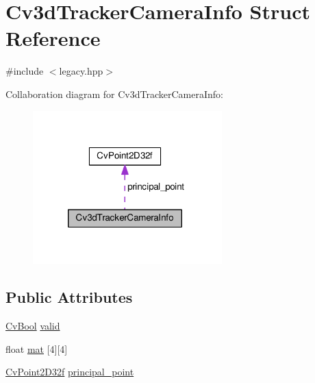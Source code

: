 \hypertarget{structCv3dTrackerCameraInfo}{\section{Cv3d\-Tracker\-Camera\-Info Struct Reference}
\label{structCv3dTrackerCameraInfo}
}


{\ttfamily \#include $<$legacy.\-hpp$>$}



Collaboration diagram for Cv3d\-Tracker\-Camera\-Info\-:\nopagebreak
\begin{figure}[H]
\begin{center}
\leavevmode
\includegraphics[width=207pt]{structCv3dTrackerCameraInfo__coll__graph}
\end{center}
\end{figure}
\subsection*{Public Attributes}
\begin{DoxyCompactItemize}
\item 
\hyperlink{legacy_8hpp_a05234b9731fdb4f89630aad4c254c105}{Cv\-Bool} \hyperlink{structCv3dTrackerCameraInfo_adc4a63ad78f2d9eda45418c1a37cc3f2}{valid}
\item 
float \hyperlink{structCv3dTrackerCameraInfo_a73da8b3a6d20e7857eeb4eb68bce974c}{mat} \mbox{[}4\mbox{]}\mbox{[}4\mbox{]}
\item 
\hyperlink{structCvPoint2D32f}{Cv\-Point2\-D32f} \hyperlink{structCv3dTrackerCameraInfo_a95df78ef4b1e23eb238fe8544d06b322}{principal\-\_\-point}
\end{DoxyCompactItemize}


